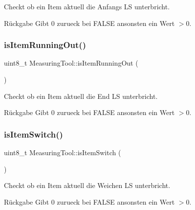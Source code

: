 Checkt ob ein Item aktuell die Anfangs LS unterbricht.

\begin{DoxyReturn}{Rückgabe}
Gibt 0 zurueck bei F\+A\+L\+SE ansonsten ein Wert $>$0. 
\end{DoxyReturn}
\hypertarget{class_measuring_tool_a0941de19234c2026359e4cc973f7bb1b}{}\label{class_measuring_tool_a0941de19234c2026359e4cc973f7bb1b} 
\subsubsection{\texorpdfstring{is\+Item\+Running\+Out()}{isItemRunningOut()}}
{\footnotesize\ttfamily uint8\+\_\+t Measuring\+Tool\+::is\+Item\+Running\+Out (\begin{DoxyParamCaption}{ }\end{DoxyParamCaption})}

Checkt ob ein Item aktuell die End LS unterbricht.

\begin{DoxyReturn}{Rückgabe}
Gibt 0 zurueck bei F\+A\+L\+SE ansonsten ein Wert $>$0. 
\end{DoxyReturn}
\hypertarget{class_measuring_tool_a25d27399efb7e1a0daceeb270e9c26cc}{}\label{class_measuring_tool_a25d27399efb7e1a0daceeb270e9c26cc} 
\subsubsection{\texorpdfstring{is\+Item\+Switch()}{isItemSwitch()}}
{\footnotesize\ttfamily uint8\+\_\+t Measuring\+Tool\+::is\+Item\+Switch (\begin{DoxyParamCaption}{ }\end{DoxyParamCaption})}

Checkt ob ein Item aktuell die Weichen LS unterbricht.

\begin{DoxyReturn}{Rückgabe}
Gibt 0 zurueck bei F\+A\+L\+SE ansonsten ein Wert $>$0. 
\end{DoxyReturn}
\hypertarget{class_measuring_tool_a33ece6093e5b77f9353f86d2d9be64f6}{}\label{class_measuring_tool_a33ece6093e5b77f9353f86d2d9be64f6} 
